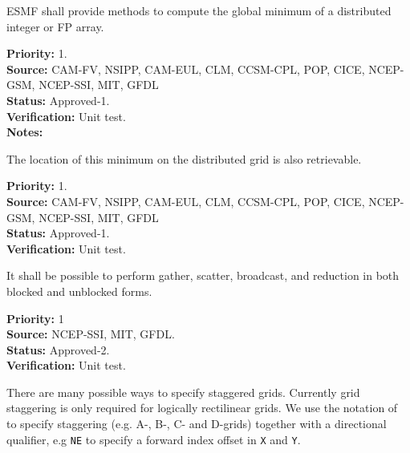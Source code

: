 
ESMF shall provide methods to compute the global minimum of a
distributed integer or FP array.

\begin{reqlist}
{\bf Priority:} 1. \\ 
{\bf Source:} CAM-FV, NSIPP, CAM-EUL, CLM, CCSM-CPL, POP, CICE, NCEP-GSM, NCEP-SSI, MIT, GFDL \\
{\bf Status:} Approved-1. \\
{\bf Verification:} Unit test. \\
{\bf Notes:}
\end{reqlist}



The location of this minimum on the distributed grid is also
retrievable.

\begin{reqlist}
{\bf Priority:} 1. \\ 
{\bf Source:} CAM-FV, NSIPP, CAM-EUL, CLM, CCSM-CPL, POP, CICE, NCEP-GSM, NCEP-SSI, MIT, GFDL \\
{\bf Status:} Approved-1. \\
{\bf Verification:} Unit test. 
\end{reqlist}


It shall be possible to perform gather, scatter, broadcast, and reduction in both blocked and unblocked forms.

\begin{reqlist}
{\bf Priority:} 1\\ 
{\bf Source:} NCEP-SSI, MIT, GFDL. \\
{\bf Status:} Approved-2. \\
{\bf Verification:} Unit test. 
\end{reqlist}


There are many possible ways to specify staggered grids.  Currently
grid staggering is only required for logically rectilinear grids. We
use the notation of \cite{ref:a1966} to specify staggering (e.g. A-,
B-, C- and D-grids) together with a directional qualifier, e.g
\texttt{NE} to specify a forward index offset in \texttt{X} and
\texttt{Y}.

\newcommand{\agrid}{\texttt{AGRID~}}
\newcommand{\bgrid}{\texttt{BGRID~}}
\newcommand{\cgrid}{\texttt{CGRID~}}
\newcommand{\dgrid}{\texttt{DGRID~}}
\newcommand{\egrid}{\texttt{EGRID~}}

